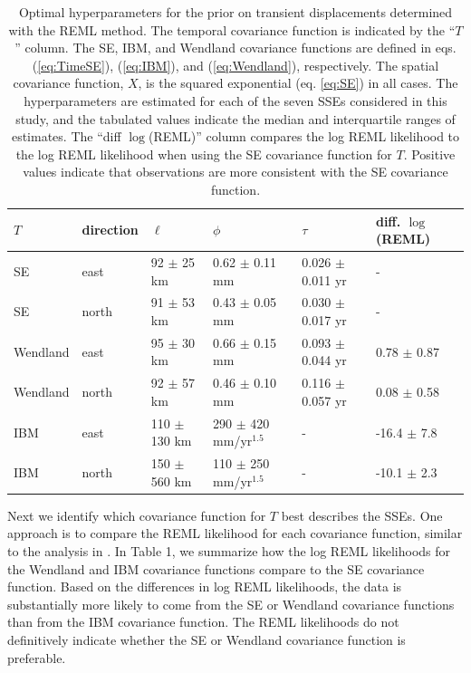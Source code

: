 \documentclass[10pt,letter]{article}
\begin{document}
\begin{table}\label{tab:Parameters}
\begin{tabular} {l l l l l l}
$T$ & direction & $\ell$  & $\phi$   & $\tau$  & diff. $\log$(REML) \\ \hline
SE & east   & 92 $\pm$ 25 km  & 0.62 $\pm$ 0.11 mm  & 0.026 $\pm$ 0.011 yr  &  - \\
SE & north  & 91 $\pm$ 53 km  & 0.43 $\pm$ 0.05 mm  & 0.030 $\pm$ 0.017 yr  &  - \\
Wendland & east   & 95 $\pm$ 30 km  & 0.66 $\pm$ 0.15 mm  & 0.093 $\pm$ 0.044 yr &  0.78 $\pm$ 0.87 \\
Wendland & north  & 92 $\pm$ 57 km  & 0.46 $\pm$ 0.10 mm  & 0.116 $\pm$ 0.057 yr &  0.08 $\pm$ 0.58 \\
IBM & east   & 110 $\pm$ 130 km & 290 $\pm$ 420 mm/yr$^{1.5}$  & -          & -16.4 $\pm$ 7.8 \\
IBM & north  & 150 $\pm$ 560 km & 110 $\pm$ 250 mm/yr$^{1.5}$ & -           & -10.1 $\pm$ 2.3 \\
\end{tabular}
\caption{Optimal hyperparameters for the prior on transient displacements determined with the REML method. The temporal covariance function is indicated by the ``$T$'' column. The SE, IBM, and Wendland covariance functions are defined in eqs. (\ref{eq:TimeSE}), (\ref{eq:IBM}), and (\ref{eq:Wendland}), respectively. The spatial covariance function, $X$, is the squared exponential (eq. \ref{eq:SE}) in all cases. The hyperparameters are estimated for each of the seven SSEs considered in this study, and the tabulated values indicate the median and interquartile ranges of estimates. The ``diff $\log$(REML)'' column compares the log REML likelihood to the log REML likelihood when using the SE covariance function for $T$. Positive values indicate that observations are more consistent with the SE covariance function.} 
\end{table}

Next we identify which covariance function for $T$ best describes the SSEs. One approach is to compare the REML likelihood for each covariance function, similar to the analysis in \citet{Langbein2004}. In Table 1, we summarize how the log REML likelihoods for the Wendland and IBM covariance functions compare to the SE covariance function.  Based on the differences in log REML likelihoods, the data is substantially more likely to come from the SE or Wendland covariance functions than from the IBM covariance function. The REML likelihoods do not definitively indicate whether the SE or Wendland covariance function is preferable. 
\end{document}
